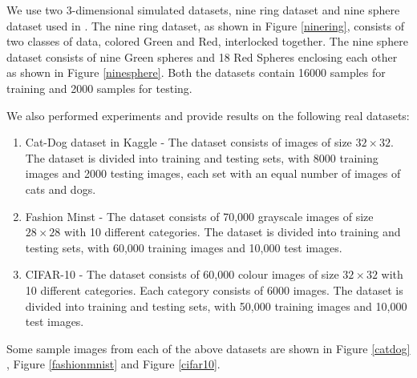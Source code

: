 \documentclass{bmvc2k}
\begin{document}
We use two 3-dimensional simulated datasets, nine ring dataset and nine sphere dataset used in \cite{naitzat2020topology}.
The  nine ring dataset, as shown in Figure \ref{ninering},  consists of two classes of data,  colored Green and Red, interlocked together.
The nine sphere dataset consists of nine Green spheres and 18 Red Spheres enclosing each other as shown in Figure \ref{ninesphere}.
Both the datasets contain 16000 samples for training and 2000 samples for testing.

We also performed experiments and provide results on the following real datasets:
\begin{enumerate}
\item Cat-Dog dataset in Kaggle - The dataset consists of  images of size $32 \times 32$. The dataset is divided into training and testing sets, with 8000 training images and 2000 testing images,  each set with an equal number of images of cats and dogs.
\item Fashion Minst - The dataset consists of 70,000 grayscale images of size $28 \times 28$ with 10 different categories. The dataset is divided into training and testing sets, with 60,000 training images and 10,000 test images.
\item CIFAR-10 - The dataset consists of 60,000 colour images of size $32 \times 32$ with 10 different categories. Each category consists of 6000 images. The dataset is divided into training and testing sets, with 50,000 training images and 10,000 test images.
\end{enumerate}

Some sample images from each of the above datasets are shown in Figure \ref{catdog} , Figure \ref{fashionmnist}  and Figure \ref{cifar10}.

%
\end{document}
